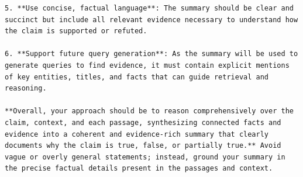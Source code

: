 \begin{instructbox}
\begin{lstlisting}[breakindent=0pt, breaklines=true, breakatwhitespace=true, frame=single, backgroundcolor=\color{blue!10}]
5. **Use concise, factual language**: The summary should be clear and succinct but include all relevant evidence necessary to understand how the claim is supported or refuted.

6. **Support future query generation**: As the summary will be used to generate queries to find evidence, it must contain explicit mentions of key entities, titles, and facts that can guide retrieval and reasoning.

**Overall, your approach should be to reason comprehensively over the claim, context, and each passage, synthesizing connected facts and evidence into a coherent and evidence-rich summary that clearly documents why the claim is true, false, or partially true.** Avoid vague or overly general statements; instead, ground your summary in the precise factual details present in the passages and context.
\end{lstlisting}
\end{instructbox}
